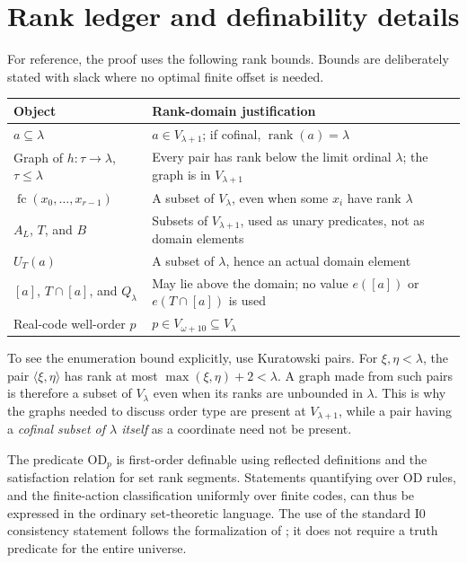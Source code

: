 \documentclass[11pt,letterpaper]{article}
\theoremstyle{definition}
\numberwithin{equation}{section}
\newcommand{\OD}{\mathrm{OD}}
\newcommand{\rank}{\operatorname{rank}}
\newcommand{\Izero}{\mathrm{I0}}
\newcommand{\fc}{\operatorname{fc}}
\begin{document}
\appendix
\section{Rank ledger and definability details}\label{app:rank}

For reference, the proof uses the following rank bounds. Bounds are deliberately stated with slack where no optimal finite offset is needed.

\begin{center}
\small
\begin{tabularx}{\textwidth}{@{}P{.35\textwidth}Y@{}}
\toprule
Object & Rank-domain justification \\
\midrule
$a\subseteq\lambda$ & $a\in V_{\lambda+1}$; if cofinal, $\rank(a)=\lambda$ \\
Graph of $h:\tau\to\lambda$, $\tau\le\lambda$ & Every pair has rank below the limit ordinal $\lambda$; the graph is in $V_{\lambda+1}$ \\
$\fc(x_0,\ldots,x_{r-1})$ & A subset of $V_\lambda$, even when some $x_i$ have rank $\lambda$ \\
$A_L$, $T$, and $B$ & Subsets of $V_{\lambda+1}$, used as unary predicates, not as domain elements \\
$U_T(a)$ & A subset of $\lambda$, hence an actual domain element \\
$[a]$, $T\cap[a]$, and $Q_\lambda$ & May lie above the domain; no value $e([a])$ or $e(T\cap[a])$ is used \\
Real-code well-order $p$ & $p\in V_{\omega+10}\subseteq V_\lambda$ \\
\bottomrule
\end{tabularx}
\end{center}

To see the enumeration bound explicitly, use Kuratowski pairs. For $\xi,\eta<\lambda$, the pair $\langle\xi,\eta\rangle$ has rank at most $\max(\xi,\eta)+2<\lambda$. A graph made from such pairs is therefore a subset of $V_\lambda$ even when its ranks are unbounded in $\lambda$. This is why the graphs needed to discuss order type are present at $V_{\lambda+1}$, while a pair having a \emph{cofinal subset of $\lambda$ itself} as a coordinate need not be present.

The predicate $\OD_p$ is first-order definable using reflected definitions and the satisfaction relation for set rank segments. Statements quantifying over OD rules, and the finite-action classification uniformly over finite codes, can thus be expressed in the ordinary set-theoretic language. The use of the standard $\Izero$ consistency statement follows the formalization of \cite{abgl}; it does not require a truth predicate for the entire universe.
\end{document}

